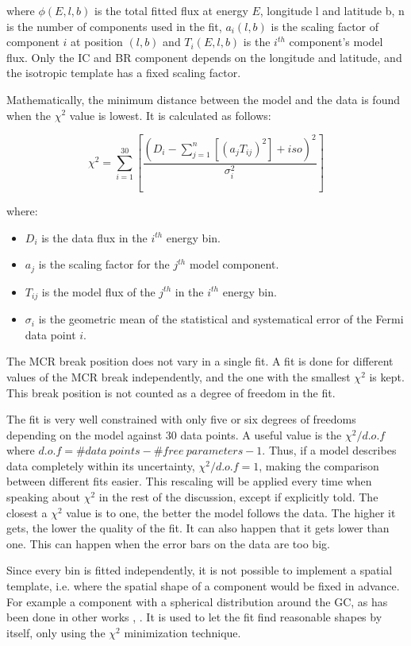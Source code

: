 where $\phi(E,l,b)$ is the total fitted flux at energy $E$, longitude l and latitude b, n is the number of components used in the fit, $a_i(l,b)$ is the scaling factor of component $i$ at position $(l,b)$ and $T_i(E,l,b)$ is the $i^{th}$ component's model flux. Only the IC and BR component depends on the longitude and latitude, and the isotropic template has a fixed scaling factor.

Mathematically, the minimum distance between the model and the data is found when the $\chi^2$ value is lowest. It is calculated as follows:

\begin{equation}
\chi^2 = \sum_{i=1}^{30} \left[ \frac{ \left( D_i - \sum_{j=1}^{n} \left[ (a_jT_{ij})^2 \right] + iso \right) ^2}{\sigma_i^2} \right]
\end{equation}

where:
\begin{itemize}
\item $D_i$ is the data flux in the $i^{th}$ energy bin.
\item $a_j$ is the scaling factor for the $j^{th}$ model component.
\item $T_{ij}$ is the model flux of the $j^{th}$ in the $i^{th}$ energy bin.
\item $\sigma_i$ is the geometric mean of the statistical and systematical error of the Fermi data point $i$.
\end{itemize}

The MCR break position does not vary in a single fit. A fit is done for different values of the MCR break independently, and the one with the smallest $\chi^2$ is kept. This break position is not counted as a degree of freedom in the fit.

The fit is very well constrained with only five or six degrees of freedoms depending on the model against 30 data points. A useful value is the $\chi^2 / d.o.f$ where $d.o.f = \#data\ points - \#free\ parameters - 1$. Thus, if a model describes data completely within its uncertainty, $\chi^2 / d.o.f = 1$, making the comparison between different fits easier. This rescaling will be applied every time when speaking about $\chi^2$ in the rest of the discussion, except if explicitly told. 
The closest a $\chi^2$ value is to one, the better the model follows the data. The higher it gets, the lower the quality of the fit. It can also happen that it gets lower than one. This can happen when the error bars on the data are too big.


Since every bin is fitted independently, it is not possible to implement a spatial template, i.e. where the spatial shape of a component would be fixed in advance. For example a component with a spherical distribution around the GC, as has been done in other works \cite{Calore2015}, \cite{Daylan2016}. It is used to let the fit find reasonable shapes by itself, only using the $\chi^2$ minimization technique.

